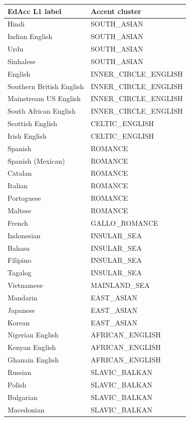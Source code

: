 \label{appendix:edacc-l1-accent-mapping}
\begin{table}[t]
\centering
\scriptsize
\setlength{\tabcolsep}{6pt}
\begin{tabular}{l l}
\toprule
\textbf{EdAcc L1 label} & \textbf{Accent cluster} \\
\midrule
Hindi & SOUTH\_ASIAN \\
Indian English & SOUTH\_ASIAN \\
Urdu & SOUTH\_ASIAN \\
Sinhalese & SOUTH\_ASIAN \\
\midrule
English & INNER\_CIRCLE\_ENGLISH \\
Southern British English & INNER\_CIRCLE\_ENGLISH \\
Mainstream US English & INNER\_CIRCLE\_ENGLISH \\
South African English & INNER\_CIRCLE\_ENGLISH \\
\midrule
Scottish English & CELTIC\_ENGLISH \\
Irish English & CELTIC\_ENGLISH \\
\midrule
Spanish & ROMANCE \\
Spanish (Mexican) & ROMANCE \\
Catalan & ROMANCE \\
Italian & ROMANCE \\
Portoguese & ROMANCE \\
Maltese & ROMANCE \\
\midrule
French & GALLO\_ROMANCE \\
\midrule
Indonesian & INSULAR\_SEA \\
Bahasa & INSULAR\_SEA \\
Filipino & INSULAR\_SEA \\
Tagalog & INSULAR\_SEA \\
\midrule
Vietnamese & MAINLAND\_SEA \\
\midrule
Mandarin & EAST\_ASIAN \\
Japanese & EAST\_ASIAN \\
Korean & EAST\_ASIAN \\
\midrule
Nigerian English & AFRICAN\_ENGLISH \\
Kenyan English & AFRICAN\_ENGLISH \\
Ghanain English & AFRICAN\_ENGLISH \\
\midrule
Russian & SLAVIC\_BALKAN \\
Polish & SLAVIC\_BALKAN \\
Bulgarian & SLAVIC\_BALKAN \\
Macedonian & SLAVIC\_BALKAN \\

\end{tabular}
\end{table}
